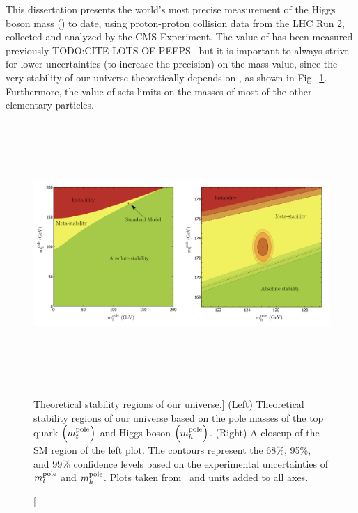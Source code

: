 This dissertation presents the world's most precise measurement of the Higgs boson mass (\mH) to date, using proton-proton collision data from the LHC Run 2, collected and analyzed by the CMS Experiment.
The value of \mh has been measured previously TODO:CITE LOTS OF PEEPS~\cite{Chatrchyan:2013lba} but it is important to always strive for lower uncertainties (\ie to increase the precision) on the mass value, since the very stability of our universe theoretically depends on \mH, as shown in Fig.~\ref{fig:universe_stability}.
Furthermore, the value of \mh sets limits on the masses of most of the other elementary particles.
\begin{figure}[hbtp]
    \centering
    \includegraphics[width=15cm,height=10cm,keepaspectratio]{figures/intro/mtop_vs_mH_universestability.png}
        \caption
        [Theoretical stability regions of our universe.]
        {
            (Left) Theoretical stability regions of our universe based on the pole masses of the top quark $\left( m_{t}^\text{pole} \right)$ and Higgs boson $\left( m_{h}^\text{pole} \right)$.
            (Right) A closeup of the SM region of the left plot.
            The contours represent the 68\%, 95\%, and 99\% confidence levels based on the experimental uncertainties of $m_{t}^\text{pole}$ and $m_{h}^\text{pole}$.
            Plots taken from~\cite{univ_stab} and units added to all axes.
        }
        \label{fig:universe_stability}
\end{figure}

